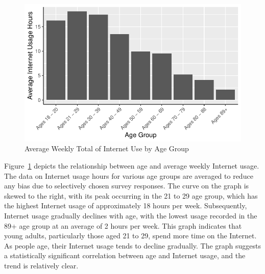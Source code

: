\documentclass[
]{article}
\begin{document}
\begin{figure}

{\centering \includegraphics{paper_files/figure-pdf/fig-ageandinternet-1.pdf}

}

\caption{\label{fig-ageandinternet}Average Weekly Total of Internet Use
by Age Group}

\end{figure}

Figure~\ref{fig-ageandinternet} depicts the relationship between age and
average weekly Internet usage. The data on Internet usage hours for
various age groups are averaged to reduce any bias due to selectively
chosen survey responses. The curve on the graph is skewed to the right,
with its peak occurring in the 21 to 29 age group, which has the highest
Internet usage of approximately 18 hours per week. Subsequently,
Internet usage gradually declines with age, with the lowest usage
recorded in the 89+ age group at an average of 2 hours per week. This
graph indicates that young adults, particularly those aged 21 to 29,
spend more time on the Internet. As people age, their Internet usage
tends to decline gradually. The graph suggests a statistically
significant correlation between age and Internet usage, and the trend is
relatively clear.
\end{document}

